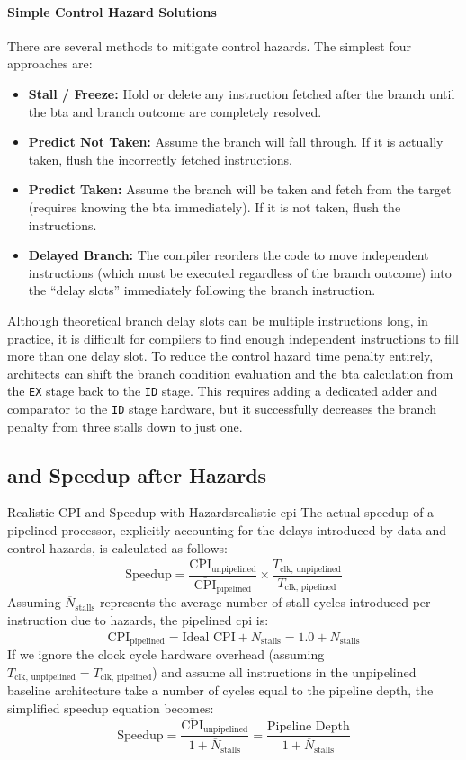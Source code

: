 \paragraph{Simple Control Hazard Solutions} 
There are several methods to mitigate control hazards. The simplest four approaches are:
\begin{itemize}
    \item \textbf{Stall / Freeze:} Hold or delete any instruction fetched after the branch until the \gls{bta} and branch outcome are completely resolved.
    \item \textbf{Predict Not Taken:} Assume the branch will fall through. If it is actually taken, flush the incorrectly fetched instructions.
    \item \textbf{Predict Taken:} Assume the branch will be taken and fetch from the target (requires knowing the \gls{bta} immediately). If it is not taken, flush the instructions.
    \item \textbf{Delayed Branch:} The compiler reorders the code to move independent instructions (which must be executed regardless of the branch outcome) into the ``delay slots'' immediately following the branch instruction.
\end{itemize}

Although theoretical branch delay slots can be multiple instructions long, in practice, it is difficult for compilers to find enough independent instructions to fill more than one delay slot. To reduce the control hazard time penalty entirely, architects can shift the branch condition evaluation and the \gls{bta} calculation from the \texttt{EX} stage back to the \texttt{ID} stage. This requires adding a dedicated adder and comparator to the \texttt{ID} stage hardware, but it successfully decreases the branch penalty from three stalls down to just one.

\subsection{ and Speedup after Hazards}
\begin{concept}{Realistic CPI and Speedup with Hazards}{realistic-cpi}
    The actual speedup of a pipelined processor, explicitly accounting for the delays introduced by data and control hazards, is calculated as follows:
    \[\text{Speedup} = \frac{\overline{\text{CPI}}_{\text{unpipelined}}}{\overline{\text{CPI}}_{\text{pipelined}}} \times \frac{T_{\text{clk, unpipelined}}}{T_{\text{clk, pipelined}}}\]
    Assuming \(\overline{N}_{\text{stalls}}\) represents the average number of stall cycles introduced per instruction due to hazards, the pipelined \gls{cpi} is:
    \[\overline{\text{CPI}}_{\text{pipelined}} = \text{Ideal CPI} + \overline{N}_{\text{stalls}} = 1.0 + \overline{N}_{\text{stalls}}\]
    If we ignore the clock cycle hardware overhead (assuming \(T_{\text{clk, unpipelined}} = T_{\text{clk, pipelined}}\)) and assume all instructions in the unpipelined baseline architecture take a number of cycles equal to the pipeline depth, the simplified speedup equation becomes:
    \[\text{Speedup} = \frac{\overline{\text{CPI}}_{\text{unpipelined}}}{1 + \overline{N}_{\text{stalls}}} = \frac{\text{Pipeline Depth}}{1 + \overline{N}_{\text{stalls}}}\]
\end{concept}